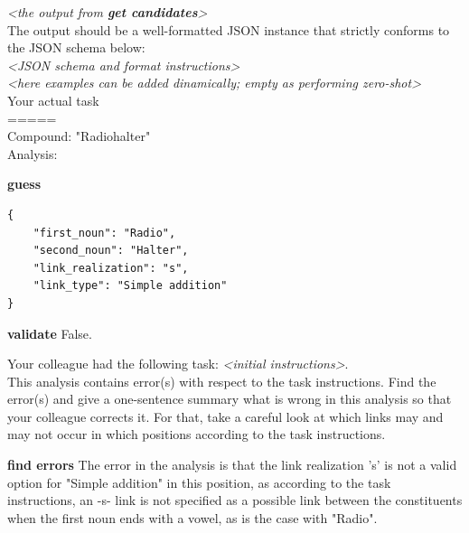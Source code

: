 \documentclass[11pt]{article}
\begin{document}
\begin{center}
\begin{tcolorbox}[colback=gray!10, colframe=black, width=\linewidth, left=1mm, right=1mm, title=Prediction of \texttt{radio\_halter} from \textit{Llama-instruct\textsubscript{+cand+par}}, breakable]
\begin{humanmessage}
            \textit{<the output from \textbf{get candidates}>} \\
            

            The output should be a well-formatted JSON instance that strictly conforms to the JSON schema below: \\
            \textit{<JSON schema and format instructions>} \\


            \textit{<here examples can be added dinamically; empty as performing zero-shot>} \\
            
            Your actual task \\
            ===== \\
            Compound: "Radiohalter" \\
            Analysis: \\
        \end{humanmessage}
        
        \begin{aimessage}{\textbf{guess}}
            \begin{verbatim}
{
    "first_noun": "Radio",
    "second_noun": "Halter",
    "link_realization": "s",
    "link_type": "Simple addition"
}
            \end{verbatim}
        \end{aimessage}
    
        \begin{toolmessage}{\textbf{validate}}
            False.
        \end{toolmessage}
    
        \begin{humanmessage}
            Your colleague had the following task: \textit{<initial instructions>}. \\
            This analysis contains error(s) with respect to the task instructions. Find the error(s) and give a one-sentence summary what is wrong in this analysis so that your colleague corrects it. For that, take a careful look at which links may and may not occur in which positions according to the task instructions.
        \end{humanmessage}
    
        \begin{aimessage}{\textbf{find errors}}
            The error in the analysis is that the link realization 's' is not a valid option for "Simple addition" in this position, as according to the task instructions, an -s- link is not specified as a possible link between the constituents when the first noun ends with a vowel, as is the case with "Radio".
        \end{aimessage}
    

\end{tcolorbox}
\end{center}
\end{document}
